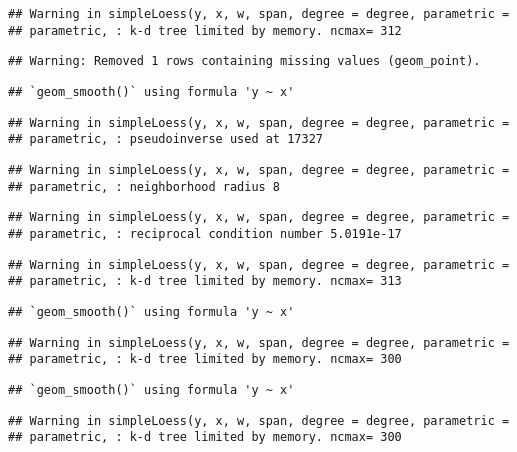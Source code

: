 \documentclass[
]{article}
\begin{document}
\begin{verbatim}
## Warning in simpleLoess(y, x, w, span, degree = degree, parametric =
## parametric, : k-d tree limited by memory. ncmax= 312
\end{verbatim}

\begin{verbatim}
## Warning: Removed 1 rows containing missing values (geom_point).
\end{verbatim}

\begin{verbatim}
## `geom_smooth()` using formula 'y ~ x'
\end{verbatim}

\begin{verbatim}
## Warning in simpleLoess(y, x, w, span, degree = degree, parametric =
## parametric, : pseudoinverse used at 17327
\end{verbatim}

\begin{verbatim}
## Warning in simpleLoess(y, x, w, span, degree = degree, parametric =
## parametric, : neighborhood radius 8
\end{verbatim}

\begin{verbatim}
## Warning in simpleLoess(y, x, w, span, degree = degree, parametric =
## parametric, : reciprocal condition number 5.0191e-17
\end{verbatim}

\begin{verbatim}
## Warning in simpleLoess(y, x, w, span, degree = degree, parametric =
## parametric, : k-d tree limited by memory. ncmax= 313
\end{verbatim}

\begin{verbatim}
## `geom_smooth()` using formula 'y ~ x'
\end{verbatim}

\begin{verbatim}
## Warning in simpleLoess(y, x, w, span, degree = degree, parametric =
## parametric, : k-d tree limited by memory. ncmax= 300
\end{verbatim}

\begin{verbatim}
## `geom_smooth()` using formula 'y ~ x'
\end{verbatim}

\begin{verbatim}
## Warning in simpleLoess(y, x, w, span, degree = degree, parametric =
## parametric, : k-d tree limited by memory. ncmax= 300
\end{verbatim}
\end{document}
